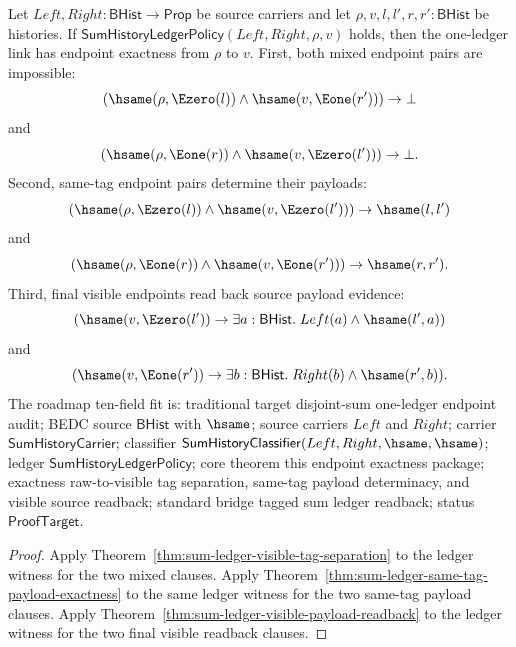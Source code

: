 \begin{theorem}
\label{thm:sum-ledger-one-step-endpoint-exactness}
Let $Left,Right:\mathsf{BHist}\to\mathsf{Prop}$ be source carriers and let
$\rho,v,l,l',r,r':\mathsf{BHist}$ be histories. If
$\mathsf{SumHistoryLedgerPolicy}(Left,Right,\rho,v)$ holds, then the one-ledger
link has endpoint exactness from $\rho$ to $v$. First, both mixed endpoint pairs
are impossible:
$$
(\hsame(\rho,\Ezero(l))\land\hsame(v,\Eone(r')))\to\bot
$$
and
$$
(\hsame(\rho,\Eone(r))\land\hsame(v,\Ezero(l')))\to\bot.
$$
Second, same-tag endpoint pairs determine their payloads:
$$
(\hsame(\rho,\Ezero(l))\land\hsame(v,\Ezero(l')))\to\hsame(l,l')
$$
and
$$
(\hsame(\rho,\Eone(r))\land\hsame(v,\Eone(r')))\to\hsame(r,r').
$$
Third, final visible endpoints read back source payload evidence:
$$
(\hsame(v,\Ezero(l'))\to\exists a:\mathsf{BHist}.\;Left(a)\land\hsame(l',a))
$$
and
$$
(\hsame(v,\Eone(r'))\to\exists b:\mathsf{BHist}.\;Right(b)\land\hsame(r',b)).
$$
The roadmap ten-field fit is: traditional target disjoint-sum one-ledger
endpoint audit; BEDC source $\mathsf{BHist}$ with $\hsame$; source carriers
$Left$ and $Right$; carrier $\mathsf{SumHistoryCarrier}$; classifier
$\mathsf{SumHistoryClassifier}(Left,Right,\hsame,\hsame)$; ledger
$\mathsf{SumHistoryLedgerPolicy}$; core theorem this endpoint exactness package;
exactness raw-to-visible tag separation, same-tag payload determinacy, and
visible source readback; standard bridge tagged sum ledger readback; status
$\mathsf{ProofTarget}$.
\end{theorem}
\begin{proof}
Apply Theorem~\ref{thm:sum-ledger-visible-tag-separation} to the ledger witness
for the two mixed clauses. Apply
Theorem~\ref{thm:sum-ledger-same-tag-payload-exactness} to the same ledger
witness for the two same-tag payload clauses. Apply
Theorem~\ref{thm:sum-ledger-visible-payload-readback} to the ledger witness for
the two final visible readback clauses.
\end{proof}

